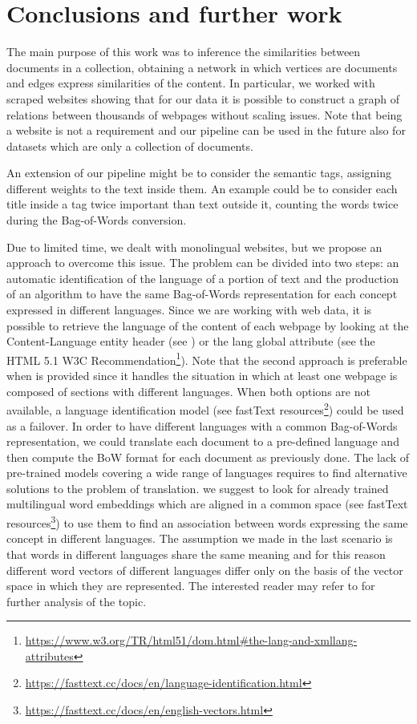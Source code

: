 \chapter{Conclusions and further work} \label{conclusions}
The main purpose of this work was to inference
the similarities between documents in a collection,
obtaining a network in which vertices are documents and
edges express similarities of the content.
In particular, we worked with scraped websites
showing that for our data it is possible to construct
a graph of relations between thousands of webpages
without scaling issues. 
Note that being a website is not a requirement and 
our pipeline can be used in the future also for 
datasets which are only a collection of documents.

An extension of our pipeline might be to consider the semantic tags, 
assigning different weights to the text inside them. 
An example could be to consider each title inside a  
tag twice important than text outside it, 
counting the words twice during the Bag-of-Words conversion.

Due to limited time, we dealt with monolingual
websites, but we propose an approach to overcome this issue.
The problem can be divided into two steps:
an automatic identification of the language of a portion of text and
the production of an algorithm to have the same Bag-of-Words
representation for each concept expressed in different languages.
Since we are working with web data, it is possible to retrieve the language
of the content of each webpage by looking at the Content-Language entity header
(see \cite{rfc7231}) or the lang global attribute
(see the HTML 5.1 W3C Recommendation\footnote{\url{https://www.w3.org/TR/html51/dom.html\#the-lang-and-xmllang-attributes}}).
Note that the second approach is preferable when  is provided
since it handles the situation in which at least
one webpage is composed of sections with different languages.
When both options are not available,
a language identification model
(see fastText resources\footnote{\url{https://fasttext.cc/docs/en/language-identification.html}})
could be used as a failover.
In order to have different languages with a common Bag-of-Words
representation, we could translate each document to a pre-defined language
and then compute the BoW format for each document as previously done.
The lack of pre-trained models covering a wide range
of languages requires to find alternative solutions to the problem of translation.
we suggest to look for already trained multilingual word embeddings
which are aligned in a common space (see fastText resources\footnote{\url{https://fasttext.cc/docs/en/english-vectors.html}})
to use them to find an association between words expressing the same concept in different languages.
The assumption we made in the last scenario is that words in different languages share
the same meaning and for this reason different word vectors of different languages differ only on the basis
of the vector space in which they are represented.
The interested reader may refer to \cite{DBLP:journals/corr/abs-1804-07745} for further analysis of the topic.

